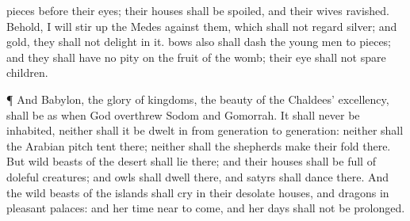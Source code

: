 {pieces before their
eyes; their
houses shall be
spoiled, and their
wives
ravished.
Behold, I will stir
up the
Medes against them, which shall not
regard
silver; and
{}
gold, they shall not
delight in it.
bows also shall
dash the young
men to
pieces; and they shall have no
pity on the
fruit of the
womb; their
eye shall not
spare
children.
\par }{\PP {}¶ And
Babylon, the
glory of
kingdoms, the
beauty of the
Chaldees’
excellency, shall be as when
God
overthrew
Sodom and
Gomorrah.
It shall
never be
inhabited, neither shall it be
dwelt in from
generation to
generation: neither shall the
Arabian pitch
tent there; neither shall the
shepherds make their
fold there.
But wild beasts of the
desert shall
lie there; and their
houses shall be
full of doleful
creatures; and
owls shall
dwell there, and
satyrs shall
dance there.
And the wild beasts of the
islands shall
cry in their desolate
houses, and
dragons in
{}
pleasant
palaces: and her
time
{}
near to
come, and her
days shall not be
prolonged.

}
